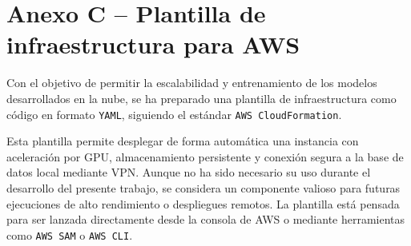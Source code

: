 \section*{Anexo C – Plantilla de infraestructura para AWS}
\label{anexo:plantilla_aws}

Con el objetivo de permitir la escalabilidad y entrenamiento de los modelos desarrollados en la nube, se ha preparado una plantilla de infraestructura como código en formato \texttt{YAML}, siguiendo el estándar \texttt{AWS CloudFormation}.

Esta plantilla permite desplegar de forma automática una instancia con aceleración por GPU, almacenamiento persistente y conexión segura a la base de datos local mediante VPN. Aunque no ha sido necesario su uso durante el desarrollo del presente trabajo, se considera un componente valioso para futuras ejecuciones de alto rendimiento o despliegues remotos. La plantilla está pensada para ser lanzada directamente desde la consola de AWS o mediante herramientas como \texttt{AWS SAM} o \texttt{AWS CLI}.

